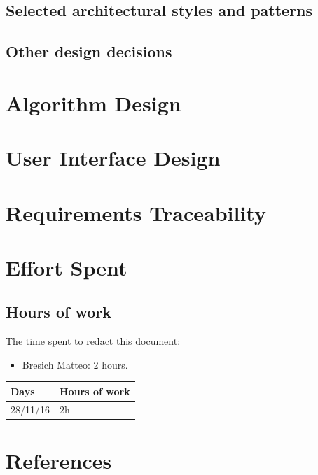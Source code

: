 \documentclass{article}
\begin{document}
		\subsection{Selected architectural styles and patterns}
		\subsection{Other design decisions}
	\section{Algorithm Design}
	\section{User Interface Design}
	\section{Requirements Traceability}
	\section{Effort Spent}
		\subsection{Hours of work} The time spent to redact this document:
		\begin{itemize}
			\item Bresich Matteo: 2 hours.
		\end{itemize}
		
		\begin{center}
			\begin{tabular}{ | l | l |}
				\hline
				Days & Hours of work\\ \hline
				28/11/16 & 2h\\\hline
				
			\end{tabular}
		\end{center}
	\section{References}
\end{document}
